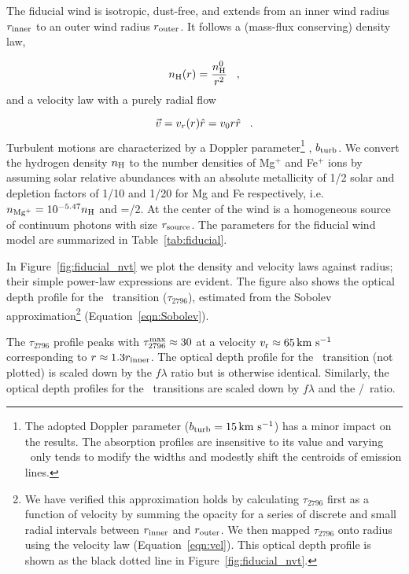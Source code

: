 \documentclass[12pt,preprint]{aastex}
\begin{document}
The fiducial wind is isotropic, dust-free, and extends from an inner wind
radius $r_{\rm inner}$ to an outer wind radius $r_{\rm outer}$.  
It follows a (mass-flux conserving) density law,

\begin{equation}
n_{\rm H} (r) = \frac{n^0_{\rm H}}{r^2} \;\;\; , 
\label{eqn:density}
\end{equation}
and a velocity law with a purely radial flow

\begin{equation}
\vec v = v_r (r) \hat r = v_0 r \hat r  \;\;\; .
\label{eqn:vel}
\end{equation}
Turbulent motions are
characterized by a Doppler parameter\footnote{
  The adopted Doppler parameter
  ($b_{\rm turb} = 15 \, {\rm km~s^{-1}}$) has a minor impact on the results.
  The absorption profiles are insensitive to its value and varying \bturb\
  only tends to modify the widths and modestly
  shift the centroids of emission lines.} 
, $b_{\rm turb}$.  
We convert the hydrogen density $n_{\rm H}$ to the number densities of
Mg$^+$ and Fe$^+$ ions by assuming solar relative abundances with an
absolute metallicity of 1/2 solar and depletion factors of 1/10 and
1/20 for Mg and Fe respectively, i.e.\  $n_{\rm Mg^+} = 10^{-5.47} n_{\rm H}$ 
and \nfe=\nmg/2. At the center of the wind is a homogeneous source of
continuum photons with size $r_{\rm source}$. The parameters for the
fiducial wind model are summarized in Table~\ref{tab:fiducial}.   

In Figure~\ref{fig:fiducial_nvt} we plot the density and velocity
laws against radius;  
their simple power-law expressions are evident.  The figure also
shows the optical depth profile for the \mgiia\ transition
($\tau_{2796}$), estimated from the Sobolev approximation\footnote{We
  have verified this approximation holds by calculating 
  $\tau_{2796}$ first
  as a function of velocity by summing the opacity for a series of
  discrete and small radial intervals
  between $r_{\rm inner}$  and $r_{\rm outer}$.   We then mapped
  $\tau_{2796}$ onto radius using the velocity law
  (Equation~\ref{eqn:vel}). This optical depth profile is shown as the
black dotted line in Figure~\ref{fig:fiducial_nvt}.}
(Equation~\ref{eqn:Sobolev}). 

The $\tau_{2796}$ profile peaks with $\tau_{2796}^{\rm max} \approx 30$
at a velocity $v_{\rm r} \approx 65 \, {\rm km~s^{-1}}$ corresponding to $r \approx 1.3
r_{\rm inner}$.  The optical depth profile for the \mgiib\ transition
(not plotted) is scaled down by the $f\lambda$ ratio but is otherwise identical.  Similarly,
the optical depth profiles for the \feiid\ transitions are
scaled down by $f \lambda$ and the \nfe/\nmg\ ratio.  
\end{document}
